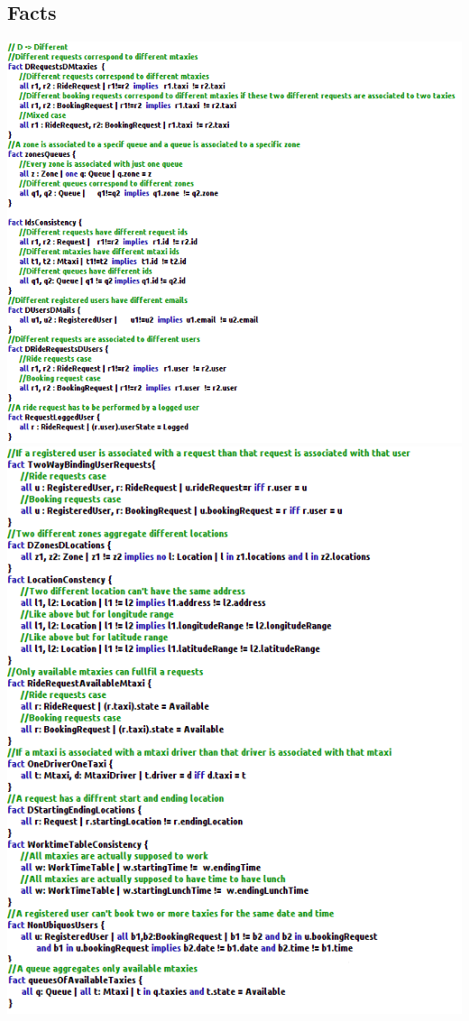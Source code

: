 \documentclass[11pt,titlepage]{article} %
\begin{document}
	\subsection{Facts}
		\includegraphics[scale=0.78]{fact1.png}
		\newpage
		\includegraphics[scale=0.8]{fact2.png}
\end{document}

